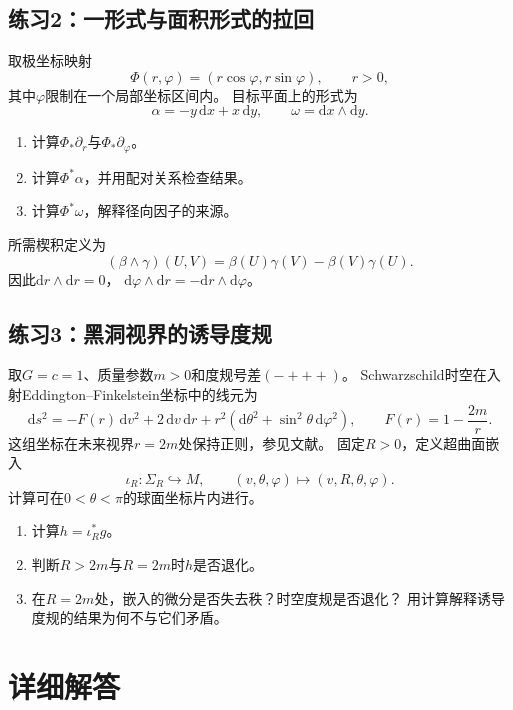 \documentclass[11pt,a4paper,fontset=fandol]{ctexart}
\newif\ifshowsolutions
\newcommand{\dd}{\mathrm{d}}
\begin{document}
\subsection*{练习2：一形式与面积形式的拉回}
取极坐标映射
\[
 \Phi(r,\varphi)=(r\cos\varphi,r\sin\varphi),
 \qquad r>0,
\]
其中$\varphi$限制在一个局部坐标区间内。
目标平面上的形式为
\[
 \alpha=-y\,\dd x+x\,\dd y,\qquad
 \omega=\dd x\wedge\dd y .
\]
\begin{enumerate}[label=(\arabic*)]
  \item 计算$\Phi_*\partial_r$与$\Phi_*\partial_\varphi$。
  \item 计算$\Phi^*\alpha$，并用配对关系检查结果。
  \item 计算$\Phi^*\omega$，解释径向因子的来源。
\end{enumerate}
所需楔积定义为
\[
 (\beta\wedge\gamma)(U,V)
 =\beta(U)\gamma(V)-\beta(V)\gamma(U).
\]
因此$\dd r\wedge\dd r=0$，
$\dd\varphi\wedge\dd r=-\dd r\wedge\dd\varphi$。

\subsection*{练习3：黑洞视界的诱导度规}
取$G=c=1$、质量参数$m>0$和度规号差$(-+++)$。
Schwarzschild时空在入射Eddington--Finkelstein坐标中的线元为
\begin{equation}
 \dd s^2=-F(r)\,\dd v^2+2\,\dd v\,\dd r
  +r^2(\dd\theta^2+\sin^2\theta\,\dd\varphi^2),
 \qquad F(r)=1-\frac{2m}{r}.
 \label{eq:ef}
\end{equation}
这组坐标在未来视界$r=2m$处保持正则，参见文献\cite{tong6}。
固定$R>0$，定义超曲面嵌入
\[
 \iota_R:\Sigma_R\hookrightarrow M,\qquad
 (v,\theta,\varphi)\mapsto(v,R,\theta,\varphi).
\]
计算可在$0<\theta<\pi$的球面坐标片内进行。
\begin{enumerate}[label=(\arabic*)]
  \item 计算$h=\iota_R^*g$。
  \item 判断$R>2m$与$R=2m$时$h$是否退化。
  \item 在$R=2m$处，嵌入的微分是否失去秩？时空度规是否退化？
  用计算解释诱导度规的结果为何不与它们矛盾。
\end{enumerate}

\ifshowsolutions
\clearpage
\section{详细解答}
\end{document}
